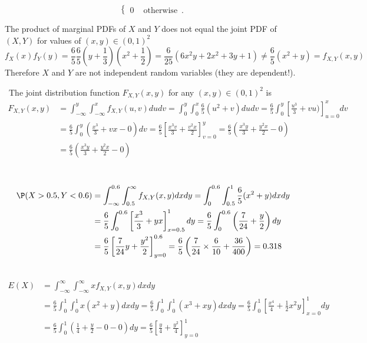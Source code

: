 \begin{ExerciseList}
\[\begin{cases}
0 & \text{ otherwise} \enspace .
\end{cases}
\]
\item The product of marginal PDFs of $X$ and $Y$ does not equal the joint PDF of $(X,Y)$ for values of $(x,y) \in (0,1)^2$
\[
f_X(x)f_Y(y) = \frac{6}{5} \frac{6}{5} \left( y + \frac{1}{3} \right) \left( x^2 + \frac{1}{2} \right) = \frac{6}{25} \left( 6 x^2y+2x^2+3y+1\right) \neq \frac{6}{5}(x^2+y) = f_{X,Y}(x,y)
\]
Therefore $X$ and $Y$ are not independent random variables (they are dependent!).
\item~The joint distribution function $F_{X,Y}(x,y)$ for any $(x,y) \in (0,1)^2$ is
\begin{align*}
F_{X,Y}(x,y) 
&= \int_{-\infty}^{y} \int_{-\infty}^{x} f_{X,Y}(u,v) du dv
= \int_{0}^{y} \int_{0}^{x} \frac{6}{5} (u^2+v) du dv
= \frac{6}{5} \int_{0}^{y} \left[ \frac{u^3}{3}+vu) \right]_{u=0}^{x} dv\\
&= \frac{6}{5} \int_{0}^{y} \left( \frac{x^3}{3}+vx - 0 \right) dv
= \frac{6}{5} \left[ \frac{x^3v}{3}+\frac{v^2x}{2} \right]_{v=0}^{y}
= \frac{6}{5} \left( \frac{x^3y}{3}+\frac{y^2x}{2} - 0 \right)\\
&= \frac{6}{5} \left( \frac{x^3y}{3}+\frac{y^2x}{2} - 0 \right)
\end{align*}
\item~
\begin{align*}
\P(X>0.5,Y<0.6) 
&= \int_{-\infty}^{0.6} \int_{0.5}^{\infty} f_{X,Y}(x,y) dx dy
= \int_{0}^{0.6} \int_{0.5}^{1} \frac{6}{5} (x^2+y) dx dy\\
&= \frac{6}{5} \int_{0}^{0.6} \left[ \frac{x^3}{3}+yx \right]_{x=0.5}^{1} dy
= \frac{6}{5} \int_{0}^{0.6} \left(\frac{7}{24} + \frac{y}{2} \right) dy\\
&= \frac{6}{5} \left[\frac{7}{24}y + \frac{y^2}{2} \right]_{y=0}^{0.6}
= \frac{6}{5} \left(\frac{7}{24}\times \frac{6}{10} + \frac{36}{400} \right)
=0.318
\end{align*}
\item~
\begin{align*}
E(X) 
&= \int_{-\infty}^{\infty} \int_{-\infty}^{\infty} x f_{X,Y}(x,y) dx dy\\
&=\frac{6}{5} \int_{0}^{1} \int_{0}^{1}  x \left( x^2 + y \right) dx dy
=\frac{6}{5} \int_{0}^{1} \int_{0}^{1}  \left( x^3 + xy \right) dx dy
= \frac{6}{5} \int_{0}^{1} \left[ \frac{x^4}{4} + \frac{1}{2}x^2y\right]_{x=0}^{1} dy\\
&=\frac{6}{5} \int_{0}^{1} \left( \frac{1}{4} + \frac{y}{2} - 0 - 0\right) dy
= \frac{6}{5} \left[ \frac{y}{4} + \frac{y^2}{4} \right]_{y=0}^{1} 

\end{align*}
\end{ExerciseList}
